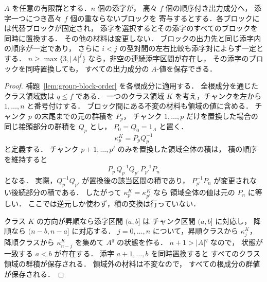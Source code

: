 \begin{lemma}[有限群における複数成分同時の区間短縮]
\label{lem:group-interval}
$A$ を任意の有限群とする．$n$ 個の添字が，
高々 $f$ 個の順序付き出力成分へ，
添字一つにつき高々 $f$ 個の重ならないブロックを
寄与するとする．各ブロックには代替ブロックが固定され，
添字を選択するとその添字のすべてのブロックを同時に置換する．
その他の材料は変更しない．
ブロックの出力先と同じ添字内の順序が一定であり，
さらに $i<j$ の型対間の左右比較も添字対によらず一定とする．
$n\ge\max\{3,|A|^f\}$ なら，非空の連続添字区間が存在し，
その添字のブロックを同時置換しても，
すべての出力成分の $A$-値を保存できる．
\end{lemma}
\begin{proof}
補題~\ref{lem:group-block-order} を各根成分に適用する．
全根成分を通じたクラス領域数は $q\le f$ である．
一つのクラス領域 $K$ を考え，チャンクを左から
$1,\ldots,n$ と番号付けする．
ブロック間にある不変の材料も領域の値に含める．
チャンク $p$ の末尾までの元の群積を $P_p$，
チャンク $1,\ldots,p$ だけを置換した場合の
同じ接頭部分の群積を $Q_p$ とし，
$P_0=Q_0=1_A$ と置く．
\[
 \kappa^K_p=P_pQ_p^{-1}
\]
と定義する．
チャンク $p+1,\ldots,p'$ のみを置換した領域全体の積は，
積の順序を維持すると
\[
 P_p\,Q_p^{-1}Q_{p'}\,P_{p'}^{-1}P_n
\]
となる．
実際，$Q_p^{-1}Q_{p'}$ が置換後の該当区間の積であり，
$P_{p'}^{-1}P_n$ が変更されない後続部分の積である．
したがって
$\kappa^K_p=\kappa^K_{p'}$ なら
領域全体の値は元の $P_n$ に等しい．
ここでは逆元しか使わず，積の交換は行っていない．

クラス $K$ の方向が昇順なら添字区間 $(a,b]$ は
チャンク区間 $(a,b]$ に対応し，
降順なら $(n-b,n-a]$ に対応する．
$j=0,\ldots,n$ について，昇順クラスから
$\kappa^K_j$，降順クラスから
$\kappa^K_{n-j}$ を集めて $A^q$ の状態を作る．
$n+1>|A|^q$ なので，
状態が一致する $a<b$ が存在する．
添字 $a+1,\ldots,b$ を同時置換すると
すべてのクラス領域の群積が保存される．
領域外の材料は不変なので，
すべての根成分の群値が保存される．
\end{proof}

